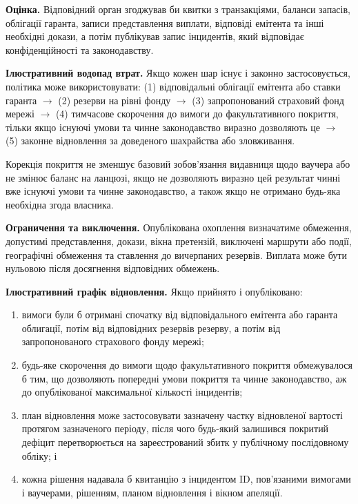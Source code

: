 \documentclass[11pt]{article}
\begin{document}
\textbf{Оцінка.} Відповідний орган згоджував би квитки з транзакціями, баланси запасів, облігації гаранта, записи представлення виплати, відповіді емітента та інші необхідні докази, а потім публікував запис інцидентів, який відповідає конфіденційності та законодавству.

\textbf{Ілюстративний водопад втрат.} Якщо кожен шар існує і законно застосовується, політика може використовувати: (1) відповідальні облігації емітента або ставки гаранта $\to$ (2) резерви на рівні фонду $\to$ (3) запропонований страховий фонд мережі $\to$ (4) тимчасове скорочення до вимоги до факультативного покриття, тільки якщо існуючі умови та чинне законодавство виразно дозволяють це $\to$ (5) законне відновлення за доведеного шахрайства або зловживання.

Корекція покриття не зменшує базовий зобов'язання видавниця щодо ваучера або не змінює баланс на ланцюзі, якщо не дозволяють виразно цей результат чинні вже існуючі умови та чинне законодавство, а також якщо не отримано будь-яка необхідна згода власника.

\textbf{Ограничення та виключення.} Опублікована охоплення визначатиме обмеження, допустимі представлення, докази, вікна претензій, виключені маршрути або події, географічні обмеження та ставлення до вичерпаних резервів. Виплата може бути нульовою після досягнення відповідних обмежень.

\textbf{Ілюстративний графік відновлення.} Якщо прийнято і опубліковано:

\begin{enumerate}[leftmargin=*]
\item вимоги були б отримані спочатку від відповідального емітента або гаранта облигації, потім від відповідних резервів резерву, а потім від запропонованого страхового фонду мережі;
\item будь-яке скорочення до вимоги щодо факультативного покриття обмежувалося б тим, що дозволяють попередні умови покриття та чинне законодавство, аж до опублікованої максимальної кількості інцидентів;
\item план відновлення може застосовувати зазначену частку відновленої вартості протягом зазначеного періоду, після чого будь-який залишився покритий дефіцит перетворюється на зареєстрований збитк у публічному послідовному обліку; і
\item кожна рішення надавала б квитанцію з інцидентом ID, пов'язаними вимогами і ваучерами, рішенням, планом відновлення і вікном апеляції.
\end{enumerate}
\end{document}
